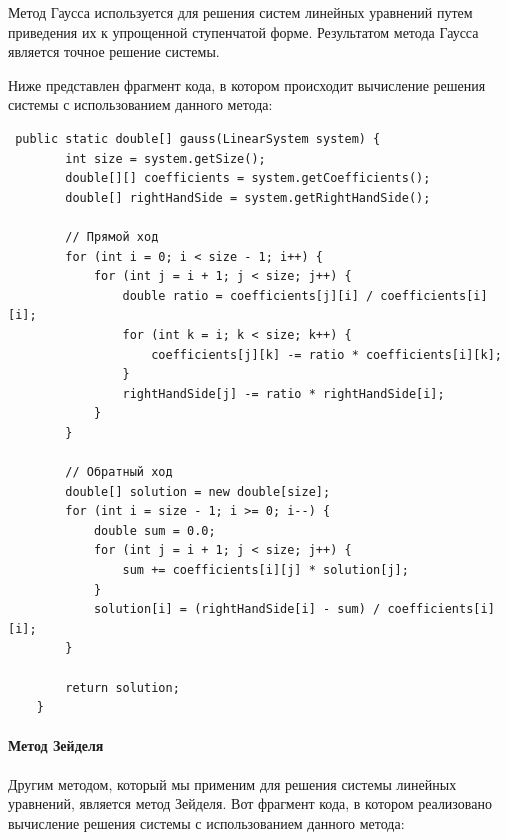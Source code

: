\documentclass[12pt]{article}
\begin{document}
Метод Гаусса используется для решения систем линейных уравнений путем приведения их к упрощенной ступенчатой форме. Результатом метода Гаусса является точное решение системы.

Ниже представлен фрагмент кода, в котором происходит вычисление решения системы с использованием данного метода:

\begin{verbatim}
 public static double[] gauss(LinearSystem system) {
        int size = system.getSize();
        double[][] coefficients = system.getCoefficients();
        double[] rightHandSide = system.getRightHandSide();

        // Прямой ход
        for (int i = 0; i < size - 1; i++) {
            for (int j = i + 1; j < size; j++) {
                double ratio = coefficients[j][i] / coefficients[i][i];
                for (int k = i; k < size; k++) {
                    coefficients[j][k] -= ratio * coefficients[i][k];
                }
                rightHandSide[j] -= ratio * rightHandSide[i];
            }
        }

        // Обратный ход
        double[] solution = new double[size];
        for (int i = size - 1; i >= 0; i--) {
            double sum = 0.0;
            for (int j = i + 1; j < size; j++) {
                sum += coefficients[i][j] * solution[j];
            }
            solution[i] = (rightHandSide[i] - sum) / coefficients[i][i];
        }

        return solution;
    }
\end{verbatim}

\paragraph{Метод Зейделя}
Другим методом, который мы применим для решения системы линейных уравнений, является метод Зейделя. Вот фрагмент кода, в котором реализовано вычисление решения системы с использованием данного метода:
\end{document}
